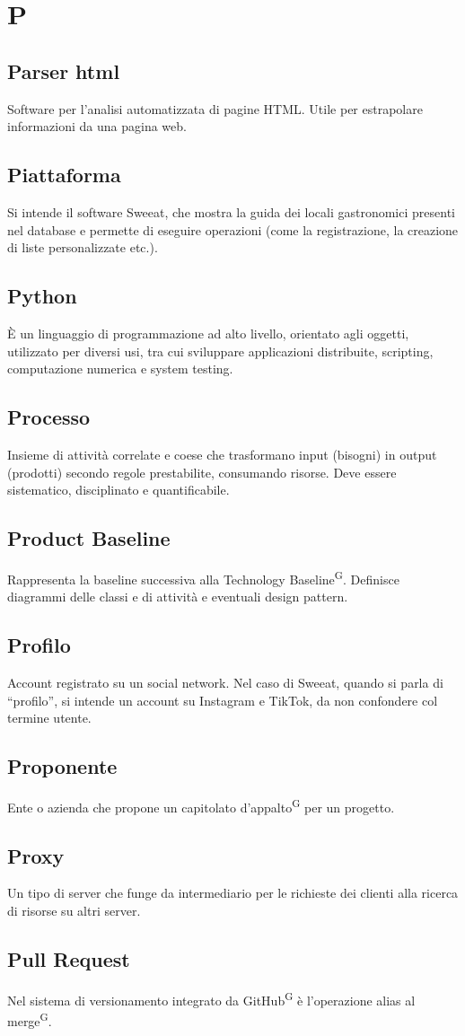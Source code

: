 \section{P}

\subsection{Parser html}
Software per l'analisi automatizzata di pagine HTML. Utile per estrapolare informazioni da una pagina web.

\subsection{Piattaforma} Si intende il software Sweeat, che mostra la guida dei locali gastronomici presenti nel database e permette di eseguire operazioni (come la registrazione, la creazione di liste personalizzate etc.).

\subsection{Python} 
È un linguaggio di programmazione ad alto livello, orientato agli oggetti, utilizzato per diversi usi, tra cui sviluppare applicazioni distribuite, scripting, computazione numerica e system testing. 

\subsection{Processo}
Insieme di attività correlate e coese che trasformano input (bisogni) in output (prodotti) secondo regole prestabilite, consumando risorse. Deve essere sistematico, disciplinato e quantificabile.

\subsection{Product Baseline}
Rappresenta la baseline successiva alla Technology Baseline\textsuperscript{G}. Definisce diagrammi delle classi e di attività e eventuali design pattern. 

\subsection{Profilo} Account registrato su un social network. Nel caso di Sweeat, quando si parla di “profilo”, si intende un account su Instagram e TikTok, da non confondere col termine utente.

\subsection{Proponente}
Ente o azienda che propone un capitolato d'appalto\textsuperscript{G} per un progetto.

\subsection{Proxy}
Un tipo di server che funge da intermediario per le richieste dei clienti alla ricerca di risorse su altri server.

\subsection{Pull Request}
Nel sistema di versionamento integrato da GitHub\textsuperscript{G} è l'operazione alias al merge\textsuperscript{G}.

\clearpage